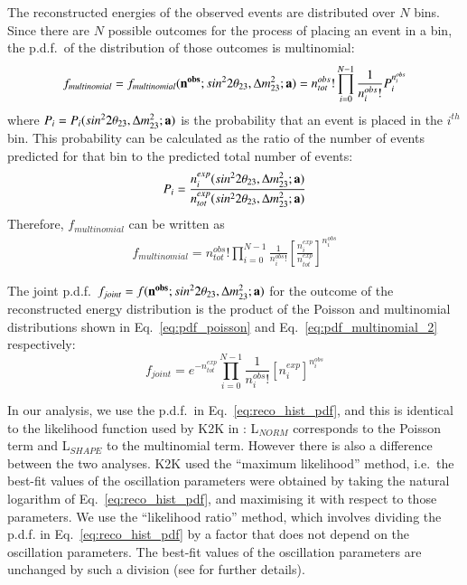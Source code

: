 The reconstructed energies of the observed events are distributed over $N$ bins. 
Since there are $N$ possible outcomes for the process of placing an event in a bin, 
the p.d.f.\ of the distribution of those outcomes is multinomial:
\begin{equation}
\begin{array}{rcl}
\displaystyle
f_{multinomial} = 
f_{multinomial}({\bf n^{obs}}; sin^{2}2\theta_{23},\Delta m^{2}_{23}; {\bf a}) = 
   n^{obs}_{tot}!\prod_{i=0}^{N-1} 
   \frac{1}{n^{obs}_{i}!} 
   P_{i}^{n^{obs}_{i}} 
\end{array}
\label{eq:pdf_multinomial_1}
\end{equation}
where $P_{i} = P_{i}(sin^{2}2\theta_{23},\Delta m^{2}_{23}; {\bf a})$
is the probability that an event is placed in the $i^{th}$ bin. 
This probability can be calculated as the ratio of the 
number of events predicted for that bin to the predicted total number of events:
\begin{equation}
\displaystyle
  P_{i} = 
  \frac{n^{exp}_{i}(sin^{2}2\theta_{23},\Delta m^{2}_{23}; {\bf a})}
       {n^{exp}_{tot}(sin^{2}2\theta_{23},\Delta m^{2}_{23}; {\bf a})}
\label{eq:prob_in_multinomial}
\end{equation}
Therefore, $f_{multinomial}$ can be written as
\begin{equation}
\begin{array}{rcl}
\displaystyle
f_{multinomial} = 
   n^{obs}_{tot}!\prod_{i=0}^{N-1} \frac{1}{n^{obs}_{i}!} 
   \left[\frac{n^{exp}_{i}}
              {n^{exp}_{tot}} \right]^{n^{obs}_{i}} 
\end{array}
\label{eq:pdf_multinomial_2}
\end{equation}

The joint p.d.f.\ $f_{joint} = f({\bf n^{obs}}; sin^{2}2\theta_{23},\Delta m^{2}_{23}; {\bf a})$ 
for the outcome of the reconstructed energy distribution 
is the product of the Poisson and multinomial distributions
shown in Eq.\ \ref{eq:pdf_poisson} and Eq.\ \ref{eq:pdf_multinomial_2} 
respectively:
\begin{equation}
\displaystyle
f_{joint} = 
   e^{-n^{exp}_{tot}} 
   \prod_{i=0}^{N-1} \frac{1}{n^{obs}_{i}!} 
   \left[n^{exp}_{i}\right]^{n^{obs}_{i}} 
\label{eq:reco_hist_pdf}
\end{equation}
 
In our analysis, we use the p.d.f.\ in Eq.\ \ref{eq:reco_hist_pdf}, and this is identical to the likelihood function used 
by K2K in \cite{K2KDisappearanceAnalysis}: 
L$_{NORM}$ corresponds to the Poisson term and L$_{SHAPE}$ to the multinomial term. 
However there is also a difference between the two analyses. K2K used the ``maximum likelihood'' method, i.e.\ the best-fit 
values of the oscillation parameters were obtained by taking the natural 
logarithm of Eq.\ \ref{eq:reco_hist_pdf}, and maximising it with respect to those parameters. We use the ``likelihood ratio''
method, which involves dividing the p.d.f. in Eq.\ \ref{eq:reco_hist_pdf} by a factor that does not depend on the oscillation parameters.
The best-fit values of the oscillation parameters are unchanged by such a division (see \cite{StatAnalysisCowan} for 
further details). 


